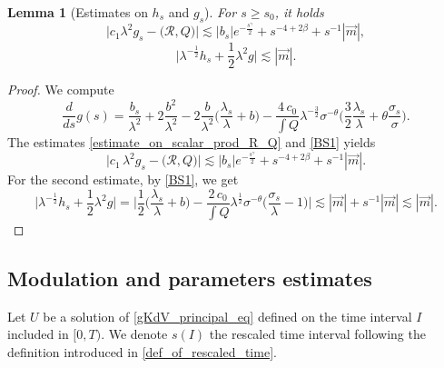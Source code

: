 \documentclass[16pt,english, oneside,reqno]{smfart}
\newtheorem{lemma}[theorem]{Lemma}
\begin{document}
\begin{lemma}[Estimates on $h_s$ and $g_s$]\label{lemma_with_estimates_on_hs_and_gs}
For $s \geq s_0 $, it holds
\begin{equation}\label{estimate_on_gs_with_prod_scal_R_Q}
    \big\lvert c_1 \lambda^2 g_s - \big(\mathcal{R},Q\big) \big\rvert \lesssim |b_s|e^{-\frac{s^{\gamma}}{2}}+s^{-4+2\beta} + s^{-1}|\vec{m}|,
\end{equation}
\begin{equation}\label{estimate_on_hs_with_g}
    \big\lvert \lambda^{-\frac{1}{2}}h_s + \frac{1}{2}\lambda^2 g \big\rvert \lesssim |\vec{m}|.
\end{equation}
\end{lemma}
\begin{proof}
    We compute
    \begin{equation}
        \frac{d}{ds}g(s) = \frac{b_s}{\lambda^2}+2\frac{b^2}{\lambda^2}-2\frac{b}{\lambda^2}\Big( \frac{\lambda_s}{\lambda}+b \Big) - \frac{4\,c_0}{\int Q} \lambda^{-\frac{3}{2}}\sigma^{-\theta}\bigg( \frac{3}{2}\frac{\lambda_s}{\lambda}+\theta\frac{\sigma_s}{\sigma} \bigg).
    \end{equation}
    The estimates \eqref{estimate_on_scalar_prod_R_Q} and \eqref{BS1} yields
    \begin{equation}
        \big\lvert c_1\,\lambda^2 g_s - \big(\mathcal{R},Q \big) \big\rvert \lesssim |b_s|e^{-\frac{s^{\gamma}}{2}}+s^{-4+2\beta} + s^{-1}|\vec{m}|.
    \end{equation}
    For the second estimate, by \eqref{BS1}, we get
    \begin{equation}
        \big\lvert \lambda^{-\frac{1}{2}}h_s + \frac{1}{2}\lambda^2 g \big\rvert = \Big\lvert \frac{1}{2}\Big(\frac{\lambda_s}{\lambda} + b\Big) - \frac{2 \, c_0}{\int Q} \lambda^{\frac{1}{2}}\sigma^{-\theta} \Big( \frac{\sigma_s}{\lambda}-1 \Big)\Big\rvert \lesssim |\vec{m}|+s^{-1}|\vec{m}|\lesssim | \vec{m}|.
    \end{equation}
\end{proof}



\subsection{Modulation and parameters estimates}
Let $U $ be a solution of \eqref{gKdV_principal_eq} defined on the time interval $I $ included in $[0,T)$. We denote $s(I)$ the rescaled time interval following the definition introduced in \eqref{def_of_rescaled_time}.
\end{document}
